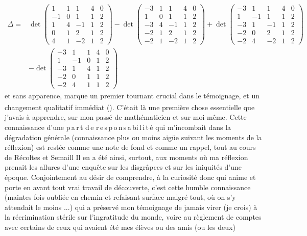 \[
\begin{aligned}
\Delta={}&\det\left(\begin{smallmatrix}1&1&1&4&0\\-1&0&1&1&2\\1&4&-1&1&2\\0&1&2&1&2\\4&1&-2&1&2\end{smallmatrix}\right)
-\det\left(\begin{smallmatrix}-3&1&1&4&0\\1&0&1&1&2\\-3&4&-1&1&2\\-2&1&2&1&2\\-2&1&-2&1&2\end{smallmatrix}\right)
+\det\left(\begin{smallmatrix}-3&1&1&4&0\\1&-1&1&1&2\\-3&1&-1&1&2\\-2&0&2&1&2\\-2&4&-2&1&2\end{smallmatrix}\right)\\
&-\det\left(\begin{smallmatrix}-3&1&1&4&0\\1&-1&0&1&2\\-3&1&4&1&2\\-2&0&1&1&2\\-2&4&1&1&2\end{smallmatrix}\right)
\end{aligned}
\]
et sans apparence, marque un premier tournant crucial dans le témoignage, et un changement qualitatif immédiat (\textsuperscript{}). C'était là une première chose essentielle que j'avais à apprendre, sur mon passé de mathématicien et sur moi-même. Cette connaissance d'une \mbox{p\,a\,r\,t} \mbox{d\,e} \mbox{r\,e\,s\,p\,o\,n\,s\,a\,bi\,l\,i\,t\,é} qui m'incombait dans la dégradation générale (connaissance plus ou moins aigüe suivant les moments de la réflexion) est restée comme une note de fond et comme un rappel, tout au cours de Récoltes et Semaill Il en a été ainsi, surtout, aux moments où ma réflexion prenait les allures d'une enquête sur les disgrâpces et sur les iniquités d'une époque. Conjointement au désir de comprendre, à la curiosité donc qui anime et porte en avant tout vrai travail de découverte, c'est cette humble connaissance (maintes fois oubliée en chemin et refaisant surface malgré tout,  où on s'y attendait le moins ...) qui a préservé mon témoignage de jamais virer (je crois) à la récrimination stérile sur l'ingratitude du monde, voire au règlement de comptes avec certains de ceux qui avaient été mes élèves ou des amis (ou les deux)

